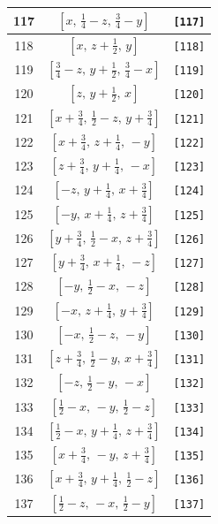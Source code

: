 \documentclass[fleqn,8pt]{jsarticle}
\begin{document}
\begin{longtable}{ccc}
117 & $\left[ x,\, \frac{1}{4} - z,\, \frac{3}{4} - y \right]$ & {\tt [117]} \\ \hline
118 & $\left[ x,\, z + \frac{1}{2},\, y \right]$ & {\tt [118]} \\ \hline
119 & $\left[ \frac{3}{4} - z,\, y + \frac{1}{2},\, \frac{3}{4} - x \right]$ & {\tt [119]} \\ \hline
120 & $\left[ z,\, y + \frac{1}{2},\, x \right]$ & {\tt [120]} \\ \hline
121 & $\left[ x + \frac{3}{4},\, \frac{1}{2} - z,\, y + \frac{3}{4} \right]$ & {\tt [121]} \\ \hline
122 & $\left[ x + \frac{3}{4},\, z + \frac{1}{4},\, - y \right]$ & {\tt [122]} \\ \hline
123 & $\left[ z + \frac{3}{4},\, y + \frac{1}{4},\, - x \right]$ & {\tt [123]} \\ \hline
124 & $\left[ - z,\, y + \frac{1}{4},\, x + \frac{3}{4} \right]$ & {\tt [124]} \\ \hline
125 & $\left[ - y,\, x + \frac{1}{4},\, z + \frac{3}{4} \right]$ & {\tt [125]} \\ \hline
126 & $\left[ y + \frac{3}{4},\, \frac{1}{2} - x,\, z + \frac{3}{4} \right]$ & {\tt [126]} \\ \hline
127 & $\left[ y + \frac{3}{4},\, x + \frac{1}{4},\, - z \right]$ & {\tt [127]} \\ \hline
128 & $\left[ - y,\, \frac{1}{2} - x,\, - z \right]$ & {\tt [128]} \\ \hline
129 & $\left[ - x,\, z + \frac{1}{4},\, y + \frac{3}{4} \right]$ & {\tt [129]} \\ \hline
130 & $\left[ - x,\, \frac{1}{2} - z,\, - y \right]$ & {\tt [130]} \\ \hline
131 & $\left[ z + \frac{3}{4},\, \frac{1}{2} - y,\, x + \frac{3}{4} \right]$ & {\tt [131]} \\ \hline
132 & $\left[ - z,\, \frac{1}{2} - y,\, - x \right]$ & {\tt [132]} \\ \hline
133 & $\left[ \frac{1}{2} - x,\, - y,\, \frac{1}{2} - z \right]$ & {\tt [133]} \\ \hline
134 & $\left[ \frac{1}{2} - x,\, y + \frac{1}{4},\, z + \frac{3}{4} \right]$ & {\tt [134]} \\ \hline
135 & $\left[ x + \frac{3}{4},\, - y,\, z + \frac{3}{4} \right]$ & {\tt [135]} \\ \hline
136 & $\left[ x + \frac{3}{4},\, y + \frac{1}{4},\, \frac{1}{2} - z \right]$ & {\tt [136]} \\ \hline
137 & $\left[ \frac{1}{2} - z,\, - x,\, \frac{1}{2} - y \right]$ & {\tt [137]} \\ \hline

\end{longtable}
\end{document}
